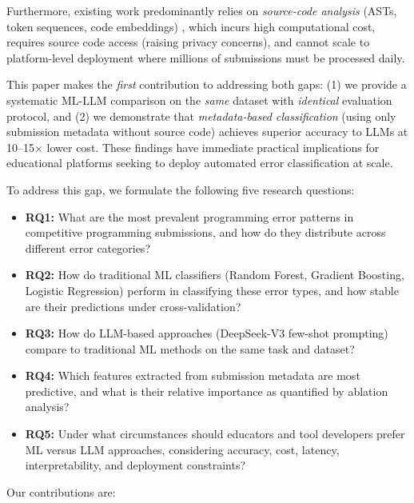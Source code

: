 \documentclass[10pt,letterpaper]{article}
\begin{document}
Furthermore, existing work predominantly relies on \textit{source-code
analysis} (ASTs, token sequences, code embeddings)
\cite{wang2017learning,feng2020codebert}, which incurs high
computational cost, requires source code access (raising privacy concerns),
and cannot scale to platform-level deployment where millions of submissions
must be processed daily.

This paper makes the \textit{first} contribution to addressing both gaps:
(1) we provide a systematic ML-LLM comparison on the \textit{same} dataset
with \textit{identical} evaluation protocol, and (2) we demonstrate that
\textit{metadata-based classification} (using only submission metadata without
source code) achieves superior accuracy to LLMs at 10--15$\times$ lower cost.
These findings have immediate practical implications for educational platforms
seeking to deploy automated error classification at scale.

To address this gap, we formulate the following five research questions:

\begin{itemize}
    \item \textbf{RQ1:} What are the most prevalent programming error patterns
          in competitive programming submissions, and how do they distribute
          across different error categories?
    \item \textbf{RQ2:} How do traditional ML classifiers (Random Forest,
          Gradient Boosting, Logistic Regression) perform in classifying these
          error types, and how stable are their predictions under cross-validation?
    \item \textbf{RQ3:} How do LLM-based approaches (DeepSeek-V3
          few-shot prompting) compare to traditional ML methods on the same task and dataset?
    \item \textbf{RQ4:} Which features extracted from submission metadata are
          most predictive, and what is their relative importance as quantified
          by ablation analysis?
    \item \textbf{RQ5:} Under what circumstances should educators and tool
          developers prefer ML versus LLM approaches, considering accuracy,
          cost, latency, interpretability, and deployment constraints?
\end{itemize}

Our contributions are:
\end{document}
